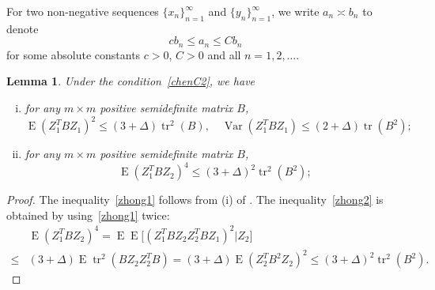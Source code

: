 \documentclass[review]{elsarticle}
\DeclareMathOperator{\mytr}{tr}
\DeclareMathOperator{\myE}{E}
\DeclareMathOperator{\myVar}{Var}
\theoremstyle{plain}
\newtheorem{lemma}{Lemma}
\theoremstyle{definition}
\theoremstyle{remark}
\begin{document}
For two non-negative sequences $\{x_n\}_{n=1}^{\infty}$ and $\{y_n\}_{n=1}^{\infty}$, we write $a_n\asymp b_n$ to denote 
\begin{equation*}
cb_n\leq a_n\leq C b_n
\end{equation*}
for some absolute constants $c>0$, $C>0$ and all $n=1,2,\ldots$.

\begin{lemma}\label{lemma:zhong1}
    Under the condition~\eqref{chenC2}, we have
    \begin{enumerate}[(i)]
        \item
            for any $m\times m$ positive semidefinite matrix $B$,
            \begin{equation}\label{zhong1}
            \myE(Z_1^T B Z_1)^2\leq (3+\Delta) \mytr^2(B),\quad
            \myVar(Z_1^T B Z_1)\leq (2+\Delta) \mytr(B^2);
            \end{equation}
        \item
            for any $m\times m$ positive semidefinite matrix $B$,
            \begin{equation}\label{zhong2}
                \myE (Z_1^T B Z_2)^4\leq (3+\Delta)^2\mytr^2 (B^2);
            \end{equation}
    \end{enumerate}
\end{lemma}
\begin{proof}
    The inequality~\eqref{zhong1} follows from (i) of \citet[Proposition A.1]{songxi2010}.
    The inequality~\eqref{zhong2} is obtained by using~\eqref{zhong1} twice:
    $$
    \begin{aligned} 
        &\myE (Z_1^T B Z_2)^4
                =\myE\myE\big[ (Z_1^T B Z_2 Z_2^T B Z_1)^2|Z_2\big]
                \\
                \leq &
                (3+\Delta)\myE  \mytr^2 (B Z_2 Z_2^T B)
                =
                (3+\Delta)\myE  (Z_2^T B^2 Z_2 )^2
                \leq (3+\Delta)^2\mytr^2 (B^2).
    \end{aligned}
    $$

\end{proof}
\end{document}
